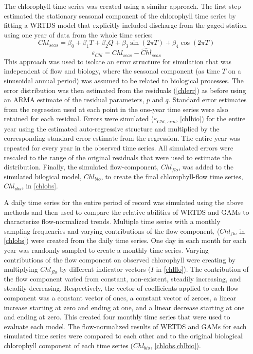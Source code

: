 \documentclass[letterpaper,12pt,oneside]{article}\usepackage[]{graphicx}\usepackage[]{color}
\begin{document}
The chlorophyll time series was created using a similar approach.  The first step estimated the stationary seasonal component of the chlorophyll time series by fitting a \ac{WRTDS} model \citep{Hirsch10} that explicitly included discharge from the gaged station using one year of data from the whole time series:
\begin{equation}\label{chlseas}
Chl_{seas} = \beta_0 + \beta_1 T + \beta_2 Q + \beta_3 \sin\left(2\pi T\right) + \beta_4 \cos\left(2\pi T\right)
\end{equation}
\begin{equation} \label{chlerr}
\varepsilon_{Chl} = Chl_{seas} - \hat{Chl}_{seas}
\end{equation}
This approach was used to isolate an error structure for simulation that was independent of flow and biology, where the seasonal component (as time $T$ on a sinusoidal annual period) was assumed to be related to biological processes.  The error distribution was then estimated from the residuals (\cref{chlerr}) as before using an \ac{ARMA} estimate of the residual parameters, $p$ and $q$.  Standard error estimates from the regression used at each point in the one-year time series were also retained for each residual.  Errors were simulated ($\varepsilon_{Chl,\,sim}$, \cref{chlbio}) for the entire year using the estimated auto-regressive structure and multiplied by the corresponding standard error estimate from the regression.  The entire year was repeated for every year in the observed time series.  All simulated errors were rescaled to the range of the original residuals that were used to estimate the distribution.  Finally, the simulated flow-component, $Chl_{flo}$, was added to the simulated bilogical model, $Chl_{bio}$, to create the final chlorophyll-flow time series, $Chl_{obs}$, in \cref{chlobs}.  

A daily time series for the entire period of record was simulated using the above methods and then used to compare the relative abilities of \ac{WRTDS} and \acp{GAM} to characterize flow-normalized trends.  Multiple time series with a monthly sampling frequencies and varying contributions of the flow component, ($Chl_{flo}$ in \cref{chlobs}) were created from the daily time series. One day in each month for each year was randomly sampled to create a monthly time series.  Varying contributions of the flow component on observed chlorophyll were creating by multiplying $Chl_{flo}$ by different indicator vectors ($I$ in \cref{chlflo}).  The contribution of the flow component varied from constant, non-existent, steadily increasing, and steadily decreasing.  Respectively, the vector of coefficients applied to each flow component was a constant vector of ones, a constant vector of zeroes, a linear increase starting at zero and ending at one, and a linear decrease starting at one and ending at zero.  This created four monthly time series that were used to evaluate each model.  The flow-normalized results of \ac{WRTDS} and \acp{GAM} for each simulated time series were compared to each other and to the original biological chlorophyll component of each time series ($Chl_{bio}$, \cref{chlobs,chlbio}).
\end{document}
